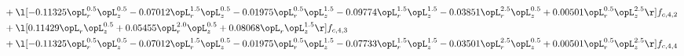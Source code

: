 \begin{alignat}{2}
& + \l[  -0.11325 \opL_r^{0.5} \opL_z^{0.5}   -0.07012 \opL_r^{1.5} \opL_z^{0.5}   -0.01975 \opL_r^{0.5} \opL_z^{1.5}   -0.09774 \opL_r^{1.5} \opL_z^{1.5}   -0.03851 \opL_r^{2.5} \opL_z^{0.5} +  0.00501 \opL_r^{0.5} \opL_z^{2.5}  \r] f_{c,4,2} \nonumber \\ 
& + \l[  0.11429 \opL_r \opL_z^{0.5} +  0.05455 \opL_r^{2.0} \opL_z^{0.5} +  0.08068 \opL_r \opL_z^{1.5}  \r] f_{c,4,3} \nonumber \\ 
& + \l[  -0.11325 \opL_r^{0.5} \opL_z^{0.5}   -0.07012 \opL_r^{1.5} \opL_z^{0.5}   -0.01975 \opL_r^{0.5} \opL_z^{1.5}   -0.07733 \opL_r^{1.5} \opL_z^{1.5}   -0.03501 \opL_r^{2.5} \opL_z^{0.5} +  0.00501 \opL_r^{0.5} \opL_z^{2.5}  \r] f_{c,4,4} \nonumber \\ 
\end{alignat} 


